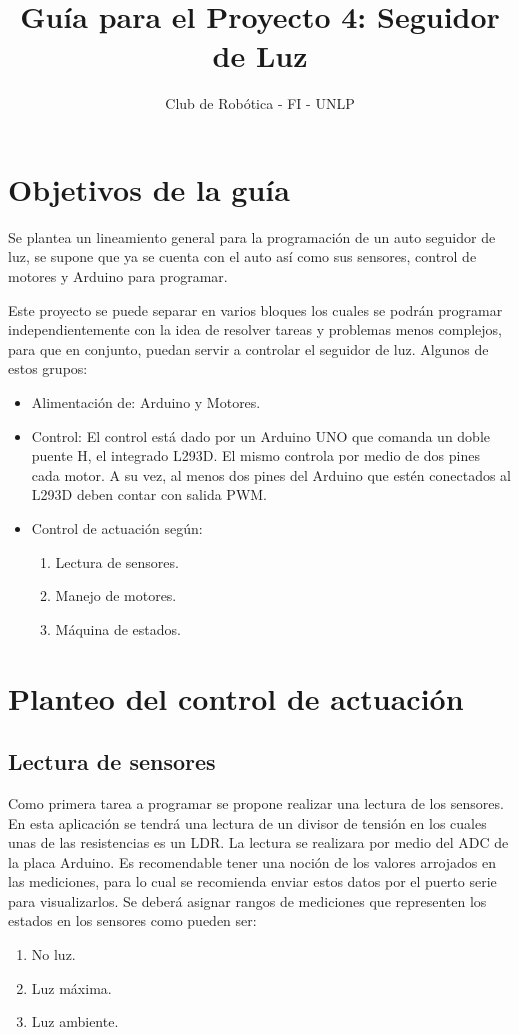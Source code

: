 \documentclass[a4paper,10pt]{article}
\title{\Huge{\textbf{Guía para el Proyecto 4: Seguidor de Luz}}}
\author{Club de Robótica - FI - UNLP}
\date{}
\begin{document}
\maketitle

\section{Objetivos de la guía}

Se plantea un lineamiento general para la programación de un auto seguidor de luz, se supone que ya se cuenta con el auto así como sus sensores, control de motores y Arduino para programar.

Este proyecto se puede separar en varios bloques los cuales se podrán programar independientemente con la idea de resolver tareas y problemas menos complejos, para que en conjunto, puedan servir a controlar el seguidor de luz. Algunos de estos grupos:

\begin{itemize}
	\item Alimentación de: Arduino y Motores.
	\item Control: El control está dado por un Arduino UNO que comanda un doble puente H, el integrado L293D. El mismo controla por medio de dos pines cada motor. A su vez, al menos dos pines del Arduino que estén conectados al L293D deben contar con salida PWM.
	\item Control de actuación según:
		\begin{enumerate}
			\item Lectura de sensores.
			\item Manejo de motores.
			\item Máquina de estados.
		\end{enumerate}
\end{itemize}

\section{Planteo del control de actuación}

\subsection*{Lectura de sensores}

Como primera tarea a programar se propone realizar una lectura de los sensores.
En esta aplicación se tendrá una lectura de un divisor de tensión en los cuales unas de las resistencias es un LDR. La lectura se realizara por medio del ADC de la placa Arduino.
Es recomendable tener una noción de los valores arrojados en las mediciones, para lo cual se recomienda enviar estos datos por el puerto serie para visualizarlos.
Se deberá asignar rangos de mediciones que representen los estados en los sensores como pueden ser:
\begin{enumerate}
	\item No luz.
	\item Luz máxima.
	\item Luz ambiente.
\end{enumerate}
\end{document}
